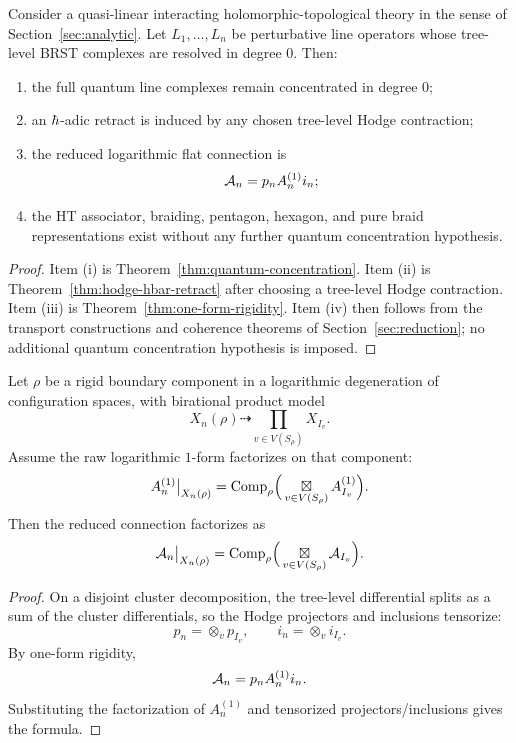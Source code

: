 \begin{theorem}%
Consider a quasi-linear interacting holomorphic-topological theory in the sense of Section~\ref{sec:analytic}. Let $L_1,\dots,L_n$ be perturbative line operators whose tree-level BRST complexes are resolved in degree $0$. Then:
\begin{enumerate}[label=\textup{(\roman*)}]
 \item the full quantum line complexes remain concentrated in degree $0$;
 \item an $\hbar$-adic retract is induced by any chosen tree-level Hodge contraction;
 \item the reduced logarithmic flat connection is
 \[
 \mathcal A_n = p_nA_n^{(1)}i_n;
 \]
 \item the HT associator, braiding, pentagon, hexagon, and pure braid representations exist without any further quantum concentration hypothesis.
\end{enumerate}
\end{theorem}

\begin{proof}
Item (i) is Theorem~\ref{thm:quantum-concentration}. Item (ii) is Theorem~\ref{thm:hodge-hbar-retract} after choosing a tree-level Hodge contraction. Item (iii) is Theorem~\ref{thm:one-form-rigidity}. Item (iv) then follows from the transport constructions and coherence theorems of Section~\ref{sec:reduction}; no additional quantum concentration hypothesis is imposed.
\end{proof}

\begin{theorem}%
Let $\rho$ be a rigid boundary component in a logarithmic degeneration of configuration spaces, with birational product model
\[
 X_n(\rho) \dashrightarrow \prod_{v\in V(S_\rho)} X_{I_v}.
\]
Assume the raw logarithmic $1$-form factorizes on that component:
\[
 A_n^{(1)}\big|_{X_n(\rho)}
 =
 \mathrm{Comp}_\rho\Big(\mathop{\boxtimes}\displaylimits_{v\in V(S_\rho)} A_{I_v}^{(1)}\Big).
\]
Then the reduced connection factorizes as
\[
 \mathcal A_n\big|_{X_n(\rho)}
 =
 \mathrm{Comp}_\rho\Big(\mathop{\boxtimes}\displaylimits_{v\in V(S_\rho)} \mathcal A_{I_v}\Big).
\]
\end{theorem}

\begin{proof}
On a disjoint cluster decomposition, the tree-level differential splits as a sum of the cluster differentials, so the Hodge projectors and inclusions tensorize:
\[
 p_n=\otimes_v p_{I_v},
 \qquad
 i_n=\otimes_v i_{I_v}.
\]
By one-form rigidity,
\[
 \mathcal A_n=p_nA_n^{(1)}i_n.
\]
Substituting the factorization of $A_n^{(1)}$ and tensorized projectors/inclusions gives the formula.
\end{proof}

